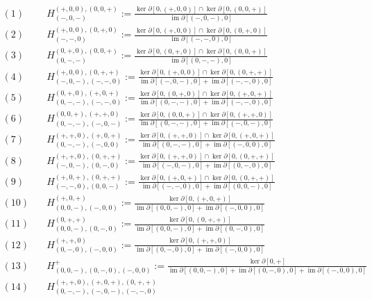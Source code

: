 \documentclass[a4paper]{article}
\DeclareMathOperator{\im}{im}
\begin{document}
\begin{align*}
(1)\quad
&H_{(-,0,-)}^{(+,0,0),(0,0,+)}
:=
\frac{
\ker\partial[0,(+,0,0)] \cap \ker\partial[0,(0,0,+)]
}{
\im\partial[(-,0,-),0]
}
\\[1ex]
(2)\quad
&H_{(-,-,0)}^{(+,0,0),(0,+,0)}
:=
\frac{
\ker\partial[0,(+,0,0)] \cap \ker\partial[0,(0,+,0)]
}{
\im\partial[(-,-,0),0]
}
\\[1ex]
(3)\quad
&H_{(0,-,-)}^{(0,+,0),(0,0,+)}
:=
\frac{
\ker\partial[0,(0,+,0)] \cap \ker\partial[0,(0,0,+)]
}{
\im\partial[(0,-,-),0]
}
\\[1ex]
(4)\quad
&H_{(-,0,-),(-,-,0)}^{(+,0,0),(0,+,+)}
:=
\frac{
\ker\partial[0,(+,0,0)] \cap \ker\partial[0,(0,+,+)]
}{
\im\partial[(-,0,-),0] + \im\partial[(-,-,0),0]
}
\\[1ex]
(5)\quad
&H_{(0,-,-),(-,-,0)}^{(0,+,0),(+,0,+)}
:=
\frac{
\ker\partial[0,(0,+,0)] \cap \ker\partial[0,(+,0,+)]
}{
\im\partial[(0,-,-),0] + \im\partial[(-,-,0),0]
}
\\[1ex]
(6)\quad
&H_{(0,-,-),(-,0,-)}^{(0,0,+),(+,+,0)}
:=
\frac{
\ker\partial[0,(0,0,+)] \cap \ker\partial[0,(+,+,0)]
}{
\im\partial[(0,-,-),0] + \im\partial[(-,0,-),0]
}
\\[1ex]
(7)\quad
&H_{(0,-,-),(-,0,0)}^{(+,+,0),(+,0,+)}
:=
\frac{
\ker\partial[0,(+,+,0)] \cap \ker\partial[0,(+,0,+)]
}{
\im\partial[(0,-,-),0] + \im\partial[(-,0,0),0]
}
\\[1ex]
(8)\quad
&H_{(-,0,-),(0,-,0)}^{(+,+,0),(0,+,+)}
:=
\frac{
\ker\partial[0,(+,+,0)] \cap \ker\partial[0,(0,+,+)]
}{
\im\partial[(-,0,-),0] + \im\partial[(0,-,0),0]
}
\\[1ex]
(9)\quad
&H_{(-,-,0),(0,0,-)}^{(+,0,+),(0,+,+)}
:=
\frac{
\ker\partial[0,(+,0,+)] \cap \ker\partial[0,(0,+,+)]
}{
\im\partial[(-,-,0),0] + \im\partial[(0,0,-),0]
}
\\[1ex]
(10)\quad
&H_{(0,0,-),(-,0,0)}^{(+,0,+)}
:=
\frac{
\ker\partial[0,(+,0,+)]
}{
\im\partial[(0,0,-),0] + \im\partial[(-,0,0),0]
}
\\[1ex]
(11)\quad
&H_{(0,0,-),(0,-,0)}^{(0,+,+)}
:=
\frac{
\ker\partial[0,(0,+,+)]
}{
\im\partial[(0,0,-),0] + \im\partial[(0,-,0),0]
}
\\[1ex]
(12)\quad
&H_{(0,-,0),(-,0,0)}^{(+,+,0)}
:=
\frac{
\ker\partial[0,(+,+,0)]
}{
\im\partial[(0,-,0),0] + \im\partial[(-,0,0),0]
}
\\[1ex]
(13)\quad
&H_{(0,0,-),(0,-,0),(-,0,0)}^{+}
:=
\frac{
\ker\partial[0,+]
}{
\im\partial[(0,0,-),0]
+
\im\partial[(0,-,0),0]
+
\im\partial[(-,0,0),0]
}
\\[1ex]
(14)\quad
&H_{(0,-,-),(-,0,-),(-,-,0)}^{(+,+,0),(+,0,+),(0,+,+)}

\end{align*}
\end{document}
